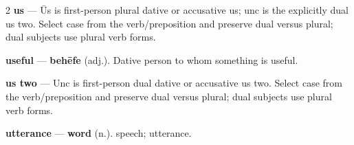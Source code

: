 \begin{multicols}{2}
\textbf{us} — Ūs is first-person plural dative or accusative us; unc is the explicitly dual us two. Select case from the verb/preposition and preserve dual versus plural; dual subjects use plural verb forms.\par
\textbf{useful} — \textbf{behēfe} (adj.). Dative person to whom something is useful.\par
\textbf{us two} — Unc is first-person dual dative or accusative us two. Select case from the verb/preposition and preserve dual versus plural; dual subjects use plural verb forms.\par
\textbf{utterance} — \textbf{word} (n.). speech; utterance.\par

\end{multicols}
